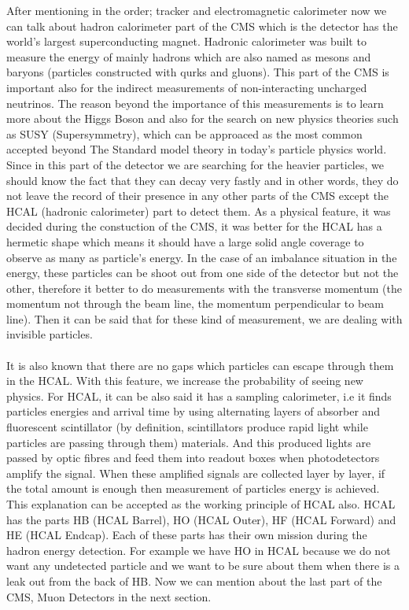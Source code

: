 \documentclass[11pt, oneside]{article}   	%
\begin{document}
After mentioning in the order; tracker 
and electromagnetic calorimeter now we can talk about hadron calorimeter
part of the CMS which is the detector has the world's largest superconducting magnet. Hadronic calorimeter was built to measure the energy of mainly hadrons
which are also named as mesons and baryons (particles constructed with qurks and gluons). This part of the CMS is important also for the indirect measurements
of non-interacting uncharged neutrinos. The reason beyond the importance of this measurements is to learn more about the Higgs Boson and also for the search
on new physics theories such as SUSY (Supersymmetry), which can be approaced as the most common accepted beyond The Standard model theory in today's particle
physics world. Since in this part of the detector we are searching for the heavier particles, we should know the fact that they can decay very fastly and in
other words, they do not leave the record of their presence in any other parts of the CMS except the HCAL (hadronic calorimeter) part to detect them.
As a physical feature, it was decided during the constuction of the CMS, it was better for the HCAL has a hermetic shape which means it should have a large solid
angle coverage to observe as many as particle's energy. In the case of an imbalance situation in the energy, these particles can be shoot out from one side of
the detector but not the other, therefore it better to do measurements with the transverse momentum (the momentum not through the beam line, the momentum perpendicular to
beam line). Then it can be said that for these kind of measurement, we are dealing with invisible particles.
\\\\
It is also known that there are no gaps which particles can escape through them in the HCAL. With this feature, we increase the probability of seeing new physics.
For HCAL, it can be also said it has a sampling calorimeter, i.e it finds particles energies and arrival time by using alternating layers of absorber and
fluorescent scintillator (by definition, scintillators produce rapid light while particles are passing through them) materials. 
And this produced lights are passed by optic fibres and feed them into readout boxes when photodetectors amplify the signal. When these amplified signals are
collected layer by layer, if the total amount is enough then measurement of particles energy is achieved. This explanation can be accepted as the working 
principle of HCAL also. HCAL has the parts HB (HCAL Barrel), HO (HCAL Outer), HF (HCAL Forward) and HE (HCAL Endcap). Each of these parts has their own
mission during the hadron energy detection. For example we have HO in HCAL because we do not want any undetected particle and we want to be sure about them
when there is a leak out  from the back of HB. Now we can mention about the last part of the CMS, Muon Detectors in the next section.
\end{document}
